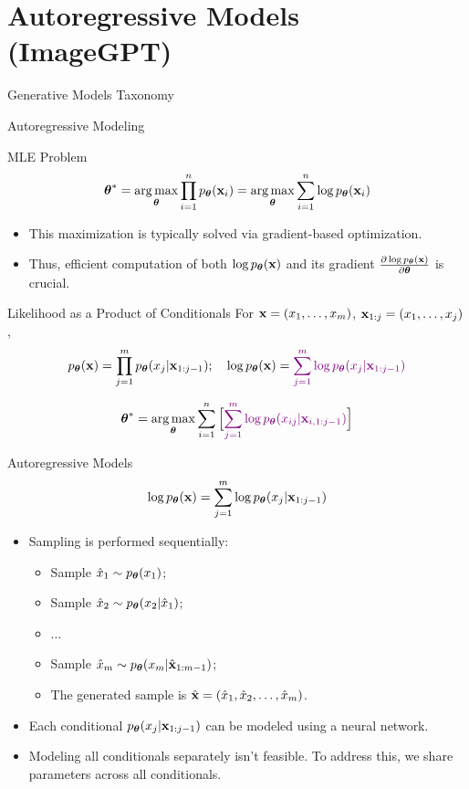 \documentclass{beamer}
\renewcommand{\eqpause}{}
\begin{document}
\section{Autoregressive Models (ImageGPT)}
\begin{frame}{Generative Models Taxonomy}
\end{frame}
\begin{frame}{Autoregressive Modeling}
    \begin{block}{MLE Problem}
	    \vspace{-0.4cm}
	    $$
	        \boldsymbol{\theta}^* = \operatorname*{arg\,max}_{\boldsymbol{\theta}} \prod_{i=1}^n p_{\boldsymbol{\theta}}(\mathbf{x}_i) = \operatorname*{arg\,max}_{\boldsymbol{\theta}} \sum_{i=1}^n \log p_{\boldsymbol{\theta}}(\mathbf{x}_i)
	    $$
	    \vspace{-0.5cm}
    \end{block}
    \eqpause
    \begin{itemize}
        \item This maximization is typically solved via gradient-based optimization.
        \item Thus, efficient computation of both $\log p_{\boldsymbol{\theta}}(\mathbf{x})$ and its gradient $\frac{\partial \log p_{\boldsymbol{\theta}}(\mathbf{x})}{\partial \boldsymbol{\theta}}$ is crucial.
    \end{itemize}
    \eqpause
    \begin{block}{Likelihood as a Product of Conditionals}
    For $\mathbf{x} = (x_1, \dots, x_m)$, $\mathbf{x}_{1:j} = (x_1, \dots, x_j)$,
    $$
        p_{\boldsymbol{\theta}}(\mathbf{x}) = \prod_{j=1}^m p_{\boldsymbol{\theta}}(x_j | \mathbf{x}_{1:j - 1});\quad
        \log p_{\boldsymbol{\theta}}(\mathbf{x}) = {\color{violet}\sum_{j=1}^m \log p_{\boldsymbol{\theta}}(x_j | \mathbf{x}_{1:j - 1})}
    $$
    \end{block}
    \eqpause
    \vspace{-0.5cm}
	 $$
	     \boldsymbol{\theta}^* =  \operatorname*{arg\,max}_{\boldsymbol{\theta}} \sum_{i=1}^n \Big[{\color{violet} \sum_{j=1}^m \log p_{\boldsymbol{\theta}}(x_{ij} | \mathbf{x}_{i, 1:j - 1})}\Big]
	 $$
\end{frame}
\begin{frame}{Autoregressive Models}
    \[
    	\log p_{\boldsymbol{\theta}}(\mathbf{x}) = \sum_{j=1}^m \log p_{\boldsymbol{\theta}}(x_j | \mathbf{x}_{1:j - 1})
    \]
    \eqpause
    \begin{itemize}
	    \item Sampling is performed sequentially:
	    \begin{itemize}
    		\item Sample $\hat{x}_1 \sim p_{\boldsymbol{\theta}}(x_1)$;
    		\item Sample $\hat{x}_2 \sim p_{\boldsymbol{\theta}}(x_2 | \hat{x}_1)$;
    		\item $\ldots$
    		\item Sample $\hat{x}_m \sim p_{\boldsymbol{\theta}}(x_m | \hat{\mathbf{x}}_{1:m-1})$;
    		\item The generated sample is $\hat{\mathbf{x}} = (\hat{x}_1, \hat{x}_2, \ldots, \hat{x}_m)$.
    	\end{itemize}
        \eqpause
        \item Each conditional $p_{\boldsymbol{\theta}}(x_j | \mathbf{x}_{1:j - 1})$ can be modeled using a neural network.
        \eqpause
        \item Modeling all conditionals separately isn't feasible. To address this, we share parameters across all conditionals.
    \end{itemize}
\end{frame}
\end{document}

